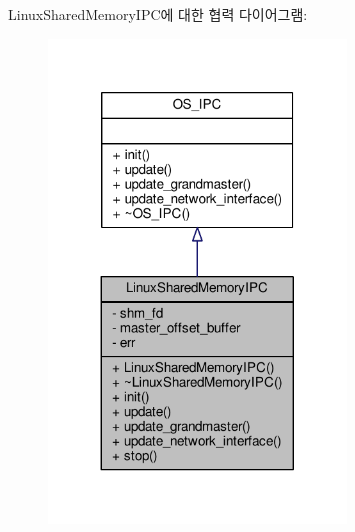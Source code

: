 Linux\+Shared\+Memory\+I\+P\+C에 대한 협력 다이어그램\+:
\nopagebreak
\begin{figure}[H]
\begin{center}
\leavevmode
\includegraphics[width=224pt]{class_linux_shared_memory_i_p_c__coll__graph}
\end{center}
\end{figure}
